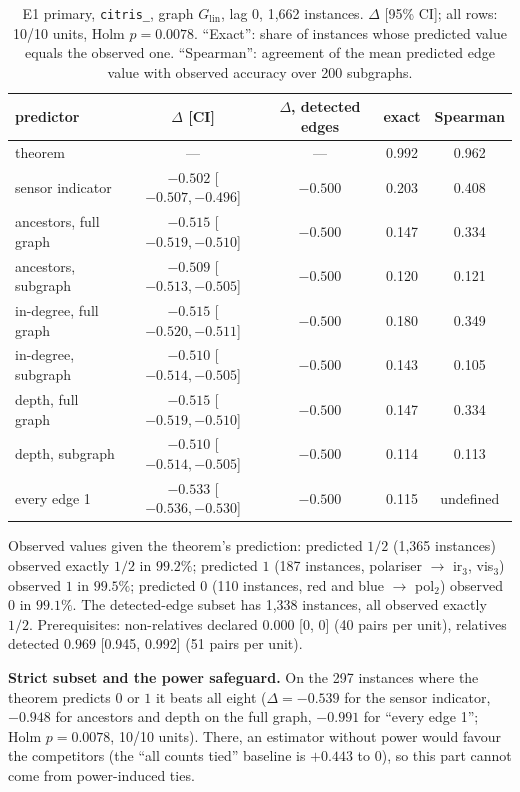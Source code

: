 \begin{table}[h]
\caption{E1 primary, \texttt{citris\_}, graph $G_{\mathrm{lin}}$, lag 0, 1{,}662 instances. $\Delta$ [95\% CI]; all rows: 10/10 units, Holm $p=0.0078$. ``Exact'': share of instances whose predicted value equals the observed one. ``Spearman'': agreement of the mean predicted edge value with observed accuracy over 200 subgraphs.}
\label{tab:e1prim}
\centering
\begin{tabular}{lcccc}
\toprule
predictor & $\Delta$ [CI] & $\Delta$, detected edges & exact & Spearman \\
\midrule
theorem & --- & --- & 0.992 & 0.962 \\
sensor indicator & $-0.502$ [$-0.507,-0.496$] & $-0.500$ & 0.203 & 0.408 \\
ancestors, full graph & $-0.515$ [$-0.519,-0.510$] & $-0.500$ & 0.147 & 0.334 \\
ancestors, subgraph & $-0.509$ [$-0.513,-0.505$] & $-0.500$ & 0.120 & 0.121 \\
in-degree, full graph & $-0.515$ [$-0.520,-0.511$] & $-0.500$ & 0.180 & 0.349 \\
in-degree, subgraph & $-0.510$ [$-0.514,-0.505$] & $-0.500$ & 0.143 & 0.105 \\
depth, full graph & $-0.515$ [$-0.519,-0.510$] & $-0.500$ & 0.147 & 0.334 \\
depth, subgraph & $-0.510$ [$-0.514,-0.505$] & $-0.500$ & 0.114 & 0.113 \\
every edge 1 & $-0.533$ [$-0.536,-0.530$] & $-0.500$ & 0.115 & undefined \\
\bottomrule
\end{tabular}
\end{table}

Observed values given the theorem's prediction: predicted $1/2$ (1{,}365 instances) observed exactly $1/2$ in $99.2\%$; predicted $1$ (187 instances,
polariser $\to$ ir$_3$, vis$_3$) observed $1$ in $99.5\%$; predicted $0$ (110 instances, red and blue $\to$ pol$_2$) observed $0$ in $99.1\%$. The detected-edge subset has 1{,}338 instances, all observed exactly $1/2$.
Prerequisites: non-relatives declared $0.000$ [0, 0] (40 pairs per unit), relatives detected $0.969$ [0.945, 0.992] (51 pairs per unit).

\textbf{Strict subset and the power safeguard.} On the 297 instances where the theorem predicts $0$ or $1$ it beats all eight ($\Delta=-0.539$ for the sensor indicator, $-0.948$ for ancestors and depth on the full graph, $-0.991$ for ``every edge 1'';
Holm $p=0.0078$, 10/10 units). There, an estimator without power would favour the competitors (the ``all counts tied'' baseline is $+0.443$ to $0$), so this part cannot come from power-induced ties.

